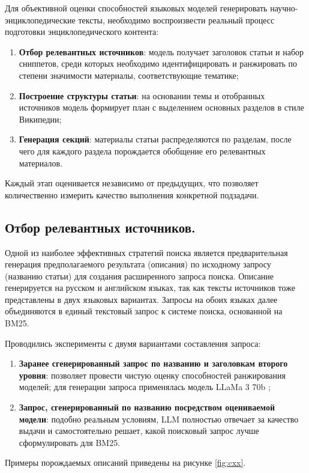\documentclass{article}
\begin{document}
Для объективной оценки способностей языковых моделей генерировать научно-энциклопедические тексты, необходимо воспроизвести реальный процесс подготовки энциклопедического контента:
\begin{enumerate}

    \item \textbf{Отбор релевантных источников}: модель получает заголовок статьи и набор сниппетов, среди которых необходимо идентифицировать и ранжировать по степени значимости материалы, соответствующие тематике; 
    
    \item \textbf{Построение структуры статьи}: на основании темы и отобранных источников модель формирует план с выделением основных разделов в стиле Википедии;
    
    \item \textbf{Генерация секций}: материалы статьи распределяются по разделам, после чего для каждого раздела порождается обобщение его релевантных материалов.

\end{enumerate}
Каждый этап оценивается независимо от предыдущих, что позволяет количественно измерить качество выполнения конкретной подзадачи. 
\subsection*{Отбор релевантных источников.}
Одной из наиболее эффективных стратегий поиска \cite{rerank} является предварительная генерация предполагаемого результата (описания) по исходному запросу (названию статьи) для создания расширенного запроса поиска.
Описание генерируется на русском и английском языках, так как тексты источников тоже представлены в двух языковых вариантах. 
Запросы на обоих языках далее объединяются в единый текстовый запрос к системе поиска, основанной на BM25. 

Проводились эксперименты с двумя вариантами составления запроса:
\begin{enumerate}

    \item \textbf{Заранее сгенерированный запрос по названию и заголовкам второго уровня}: позволяет провести чистую оценку способностей ранжирования моделей; для генерации запроса применялась модель LLaMa 3 70b \cite{llama};
    
    \item \textbf{Запрос, сгенерированный по названию посредством оцениваемой модели}: подобно реальным условиям, LLM полностью отвечает за качество выдачи и самостоятельно решает, какой поисковый запрос лучше сформулировать для BM25.

\end{enumerate}
Примеры порождаемых описаний приведены на рисунке \ref{fig:cxx}.
\end{document}
